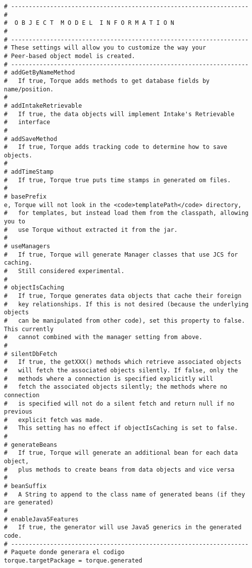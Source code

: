 \begin{lstlisting}
# -------------------------------------------------------------------
#
#  O B J E C T  M O D E L  I N F O R M A T I O N
#
# -------------------------------------------------------------------
# These settings will allow you to customize the way your
# Peer-based object model is created.
# -------------------------------------------------------------------
# addGetByNameMethod
#   If true, Torque adds methods to get database fields by name/position.
#
# addIntakeRetrievable
#   If true, the data objects will implement Intake's Retrievable
#   interface
#
# addSaveMethod
#   If true, Torque adds tracking code to determine how to save objects.
#
# addTimeStamp
#   If true, Torque true puts time stamps in generated om files.
#
# basePrefix
e, Torque will not look in the <code>templatePath</code> directory,
#   for templates, but instead load them from the classpath, allowing you to
#   use Torque without extracted it from the jar.
#
# useManagers
#   If true, Torque will generate Manager classes that use JCS for caching.
#   Still considered experimental.
#
# objectIsCaching
#   If true, Torque generates data objects that cache their foreign
#   key relationships. If this is not desired (because the underlying objects
#   can be manipulated from other code), set this property to false. This currently
#   cannot combined with the manager setting from above.
#
# silentDbFetch
#   If true, the getXXX() methods which retrieve associated objects
#   will fetch the associated objects silently. If false, only the
#   methods where a connection is specified explicitly will
#   fetch the associated objects silently; the methods where no connection
#   is specified will not do a silent fetch and return null if no previous
#   explicit fetch was made.
#   This setting has no effect if objectIsCaching is set to false.
#
# generateBeans
#   If true, Torque will generate an additional bean for each data object,
#   plus methods to create beans from data objects and vice versa
#
# beanSuffix
#   A String to append to the class name of generated beans (if they are generated)
#
# enableJava5Features
#   If true, the generator will use Java5 generics in the generated code.
# -------------------------------------------------------------------
# Paquete donde generara el codigo
torque.targetPackage = torque.generated


\end{lstlisting}
